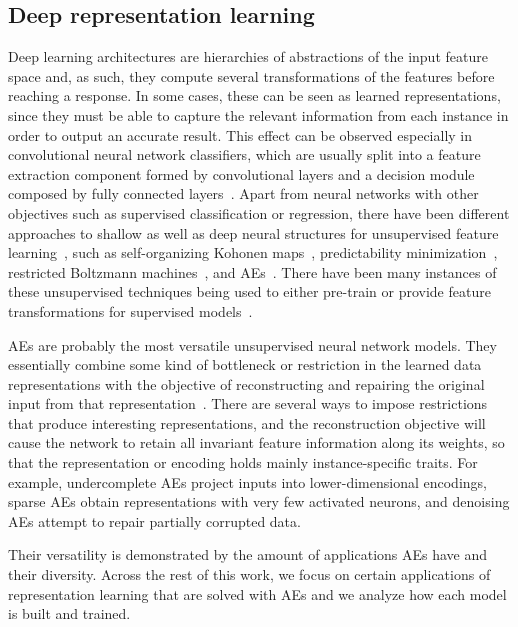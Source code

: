 \subsection{Deep representation learning}

Deep learning architectures are hierarchies of abstractions of the input feature space and, as such, they compute several transformations of the features before reaching a response. In some cases, these can be seen as learned representations, since they must be able to capture the relevant information from each instance in order to output an accurate result. This effect can be observed especially in convolutional neural network classifiers, which are usually split into a feature extraction component formed by convolutional layers and a decision module composed by fully connected layers~. Apart from neural networks with other objectives such as supervised classification or regression, there have been different approaches to shallow as well as deep neural structures for unsupervised feature learning~, such as self-organizing Kohonen maps~, predictability minimization~, restricted Boltzmann machines~, and AEs~. There have been many instances of these unsupervised techniques being used to either pre-train or provide feature transformations for supervised models~.

AEs are probably the most versatile unsupervised neural network models. They essentially combine some kind of bottleneck or restriction in the learned data representations with the objective of reconstructing and repairing the original input from that representation~. There are several ways to impose restrictions that produce interesting representations, and the reconstruction objective will cause the network to retain all invariant feature information along its weights, so that the representation or encoding holds mainly instance-specific traits. For example, undercomplete AEs project inputs into lower-dimensional encodings, sparse AEs obtain representations with very few activated neurons, and denoising AEs attempt to repair partially corrupted data.

Their versatility is demonstrated by the amount of applications AEs have and their diversity. Across the rest of this work, we focus on certain applications of representation learning that are solved with AEs and we analyze how each model is built and trained. 


